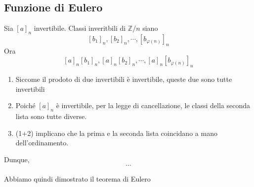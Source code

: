 \documentclass[a4paper]{article}
\begin{document}
\subsection{Funzione di Eulero}

Sia \({[a]}_n\) invertibile.
Classi inveritbili di \(\mathbb{Z} / n\) siano
\[
    {[b_1]}_n, {[b_2]}_n, \cdots, {[b_{\varphi(n)}]}_n
\]
Ora
\[
    {[a]}_n{[b_1]}_n, {[a]}_n{[b_2]}_n, \cdots, {[a]}_n{[b_{\varphi(n)}]}_n
\]

\begin{enumerate}
    \item Siccome il prodoto di due invertibili è invertibile, queste due sono tutte invertibili
    \item Poiché \({[a]}_n\) è invertibile, per la legge di cancellazione, le classi della seconda lista sono tutte diverse.
    \item (1+2) implicano che la prima e la seconda lista coincidano a mano dell'ordinamento.
\end{enumerate}
Dunque,
\[
    \cdots
\]

Abbiamo quindi dimostrato il teorema di Eulero



\end{document}
